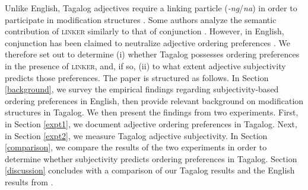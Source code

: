 \documentclass[12pt,letterpaper]{article}
\begin{document}
Unlike English, Tagalog adjectives require a linking particle (\emph{-ng}/\emph{na}) in order to participate in modification structures \citep{foley1975,rubin1994,kaufman2009}. Some authors analyze the semantic contribution of \textsc{linker} similarly to that of conjunction \citep{rubin1994,scontrasnicolae2014}. However, in English, conjunction has been claimed to neutralize adjective ordering preferences \citep{fordolson1975,byrne1979}. We therefore set out to determine (i) whether Tagalog possesses ordering preferences in the presence of \textsc{linker}, and, if so, (ii) to what extent adjective subjectivity predicts those preferences. The paper is structured as follows. In Section \ref{background}, we survey the empirical findings regarding subjectivity-based ordering preferences in English, then provide relevant background on modification structures in Tagalog. We then present the findings from two experiments. First, in Section \ref{expt1}, we document adjective ordering preferences in Tagalog. Next, in Section \ref{expt2}, we measure Tagalog adjective subjectivity. In Section \ref{comparison}, we compare the results of the two experiments in order to determine whether subjectivity predicts ordering preferences in Tagalog. Section \ref{discussion} concludes with a comparison of our Tagalog results and the English results from \cite{scontrasetal2017adjectives}.

\end{document}
